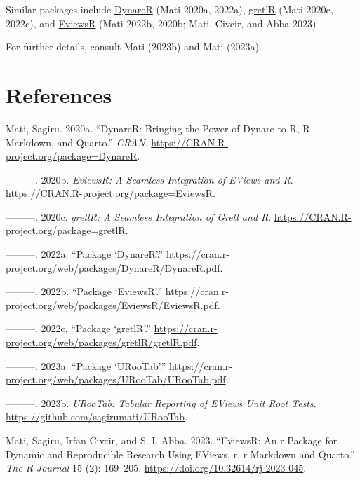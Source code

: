\documentclass[
  letterpaper,
  DIV=11,
  numbers=noendperiod]{scrartcl}
\newlength{\cslhangindent}
\newlength{\cslentryspacingunit} %
\newenvironment{CSLReferences}[2] %
 {%
  \setlength{\parindent}{0pt}
  \ifodd #1
  \let\oldpar\par
  \def\par{\hangindent=\cslhangindent\oldpar}
  \fi
  \setlength{\parskip}{#2\cslentryspacingunit}
 }%
 {}
\begin{document}
Similar packages include
\href{https://github.com/sagirumati/DynareR}{DynareR} (Mati 2020a,
2022a), \href{https://github.com/sagirumati/gretlR}{gretlR} (Mati 2020c,
2022c), and \href{https://github.com/sagirumati/EviewsR}{EviewsR} (Mati
2022b, 2020b; Mati, Civcir, and Abba 2023)

For further details, consult Mati (2023b) and Mati (2023a).

\hypertarget{references}{%
\section*{References}\label{references}}

\hypertarget{refs}{}
\begin{CSLReferences}{1}{0}
\leavevmode{}%
Mati, Sagiru. 2020a. {``DynareR: Bringing the Power of Dynare to {R, R
Markdown, and Quarto}.''} \emph{CRAN}.
\url{https://CRAN.R-project.org/package=DynareR}.

\leavevmode{}%
---------. 2020b. \emph{EviewsR: A Seamless Integration of {EViews} and
{R}}. \url{https://CRAN.R-project.org/package=EviewsR}.

\leavevmode{}%
---------. 2020c. \emph{gretlR: A Seamless Integration of {Gretl} and
{R}}. \url{https://CRAN.R-project.org/package=gretlR}.

\leavevmode{}%
---------. 2022a. {``Package {`DynareR'}.''}
\url{https://cran.r-project.org/web/packages/DynareR/DynareR.pdf}.

\leavevmode{}%
---------. 2022b. {``Package {`EviewsR'}.''}
\url{https://cran.r-project.org/web/packages/EviewsR/EviewsR.pdf}.

\leavevmode{}%
---------. 2022c. {``Package {`gretlR'}.''}
\url{https://cran.r-project.org/web/packages/gretlR/gretlR.pdf}.

\leavevmode{}%
---------. 2023a. {``Package {`URooTab'}.''}
\url{https://cran.r-project.org/web/packages/URooTab/URooTab.pdf}.

\leavevmode{}%
---------. 2023b. \emph{{URooTab}: Tabular Reporting of {EViews} Unit
Root Tests}. \url{https://github.com/sagirumati/URooTab}.

\leavevmode{}%
Mati, Sagiru, Irfan Civcir, and S. I. Abba. 2023. {``{EviewsR}: An r
Package for Dynamic and Reproducible Research Using {EViews}, r, r
Markdown and Quarto.''} \emph{The R Journal} 15 (2): 169--205.
\url{https://doi.org/10.32614/rj-2023-045}.

\end{CSLReferences}
\end{document}
